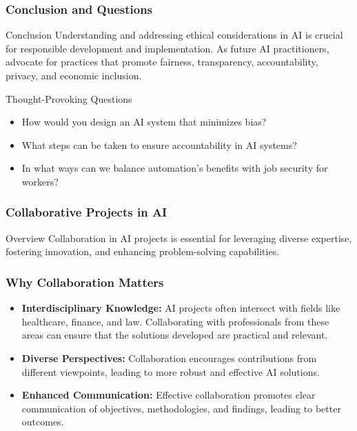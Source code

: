 \documentclass[aspectratio=169]{beamer}
\begin{document}
\begin{frame}[fragile]
    \frametitle{Conclusion and Questions}
    \begin{block}{Conclusion}
        Understanding and addressing ethical considerations in AI is crucial for responsible development and implementation. As future AI practitioners, advocate for practices that promote fairness, transparency, accountability, privacy, and economic inclusion.
    \end{block}
    
    \begin{block}{Thought-Provoking Questions}
        \begin{itemize}
            \item How would you design an AI system that minimizes bias?
            \item What steps can be taken to ensure accountability in AI systems?
            \item In what ways can we balance automation's benefits with job security for workers?
        \end{itemize}
    \end{block}
\end{frame}

\begin{frame}[fragile]
    \frametitle{Collaborative Projects in AI}
    \begin{block}{Overview}
        Collaboration in AI projects is essential for leveraging diverse expertise, fostering innovation, and enhancing problem-solving capabilities.
    \end{block}
\end{frame}

\begin{frame}[fragile]
    \frametitle{Why Collaboration Matters}
    \begin{itemize}
        \item \textbf{Interdisciplinary Knowledge:} 
            AI projects often intersect with fields like healthcare, finance, and law. Collaborating with professionals from these areas can ensure that the solutions developed are practical and relevant.
        \item \textbf{Diverse Perspectives:} 
            Collaboration encourages contributions from different viewpoints, leading to more robust and effective AI solutions.
        \item \textbf{Enhanced Communication:} 
            Effective collaboration promotes clear communication of objectives, methodologies, and findings, leading to better outcomes.
    \end{itemize}
\end{frame}
\end{document}
